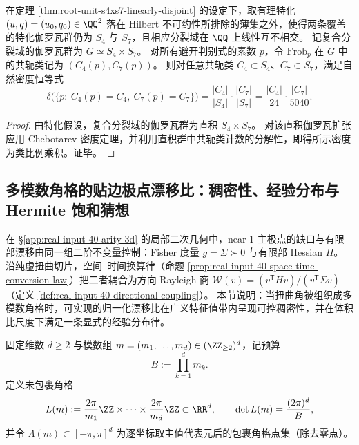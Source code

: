 \begin{corollary}\label{cor:root-unit-s4xs7-chebotarev-product}
在定理 \ref{thm:root-unit-s4xs7-linearly-disjoint} 的设定下，取有理特化 \((u,q)=(u_0,q_0)\in\QQ^2\) 落在 Hilbert 不可约性所排除的薄集之外，使得两条覆盖的特化伽罗瓦群仍为 \(S_4\) 与 \(S_7\)，且相应分裂域在 \(\QQ\) 上线性互不相交。
记复合分裂域的伽罗瓦群为 \(G\simeq S_4\times S_7\)。
对所有避开判别式的素数 \(p\)，令 \(\mathrm{Frob}_p\) 在 \(G\) 中的共轭类记为 \((C_4(p),C_7(p))\)。
则对任意共轭类 \(C_4\subset S_4\)、\(C_7\subset S_7\)，满足自然密度恒等式
\[
\delta\bigl(\{p:\ C_4(p)=C_4,\ C_7(p)=C_7\}\bigr)
=\frac{|C_4|}{|S_4|}\cdot\frac{|C_7|}{|S_7|}
=\frac{|C_4|}{24}\cdot\frac{|C_7|}{5040}.
\]
\end{corollary}

\begin{proof}
由特化假设，复合分裂域的伽罗瓦群为直积 \(S_4\times S_7\)。
对该直积伽罗瓦扩张应用 Chebotarev 密度定理，并利用直积群中共轭类计数的分解性，即得所示密度为类比例乘积。证毕。
\end{proof}

\subsection{多模数角格的贴边极点漂移比：稠密性、经验分布与 Hermite 饱和猜想}\label{subsec:root-unit-angle-lattice-drift-ratio}

在 \S\ref{app:real-input-40-arity-3d} 的局部二次几何中，near-\(1\) 主极点的缺口与有限部漂移由同一组二阶不变量控制：Fisher 度量 \(g=\Sigma\succ 0\) 与有限部 Hessian \(H\)。
沿纯虚扭曲切片，空间--时间换算律（命题 \ref{prop:real-input-40-space-time-conversion-law}）把二者耦合为方向 Rayleigh 商 \(\mathcal{W}(v)=(v^{\mathsf T}Hv)/(v^{\mathsf T}\Sigma v)\)（定义 \ref{def:real-input-40-directional-coupling}）。
本节说明：当扭曲角被组织成多模数角格时，可实现的归一化漂移比在广义特征值带内呈现可控稠密性，并在体积比尺度下满足一条显式的经验分布律。

\begin{definition}[多模数角格与预算]\label{def:root-unit-angle-lattice}
固定维数 \(d\ge 2\) 与模数组 \(m=(m_1,\dots,m_d)\in(\ZZ_{\ge 2})^d\)，记预算
\[
B:=\prod_{k=1}^d m_k.
\]
定义未包裹角格
\[
L(m):=\frac{2\pi}{m_1}\ZZ\times\cdots\times \frac{2\pi}{m_d}\ZZ\subset\RR^d,
\qquad
\det L(m)=\frac{(2\pi)^d}{B},
\]
并令 \(\Lambda(m)\subset[-\pi,\pi]^d\) 为逐坐标取主值代表元后的包裹角格点集（除去零点）。
\end{definition}

